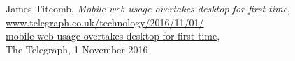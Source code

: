 
\cleardoublepage{}

\begin{thebibliography}{9}
   
      James Titcomb,
      \textit{Mobile web usage overtakes desktop for first time},\\
      \href{www.telegraph.co.uk/technology/2016/11/01/mobile-web-usage-overtakes-desktop-for-first-time}{www.telegraph.co.uk/technology/2016/11/01/\\mobile-web-usage-overtakes-desktop-for-first-time},\\
      The Telegraph,
      1 November 2016
   
   \end{thebibliography}